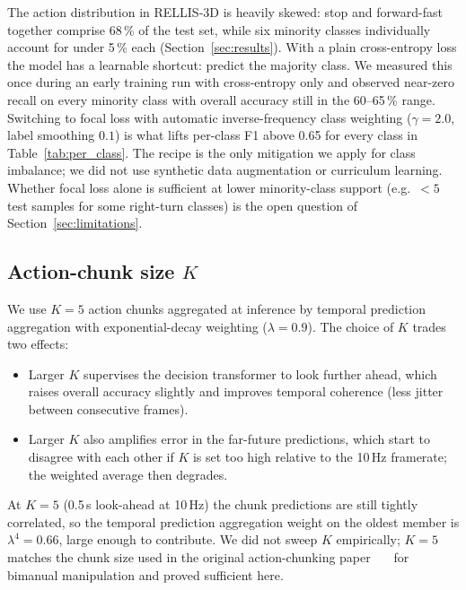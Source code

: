 \documentclass[sensors,article,submit,pdftex,moreauthors]{Definitions/mdpi}
\providecommand{\DIFadd}[1]{{\protect\color{red}#1}} %
\begin{document}
\DIFadd{The action distribution in RELLIS-3D is heavily skewed: stop and forward-fast together comprise 68\,\% of the test set, while six minority classes individually account for under 5\,\% each (Section~\ref{sec:results}). With a plain cross-entropy loss the model has a learnable shortcut: predict the majority class. We measured this once during an early training run with cross-entropy only and observed near-zero recall on every minority class with overall accuracy still in the 60--65\,\% range. Switching to focal loss with automatic inverse-frequency class weighting ($\gamma{=}2.0$, label smoothing $0.1$) is what lifts per-class F1 above 0.65 for every class in Table~\ref{tab:per_class}. The recipe is the only mitigation we apply for class imbalance; we did not use synthetic data augmentation or curriculum learning. Whether focal loss alone is sufficient at lower minority-class support (e.g.\ $<5$ test samples for some right-turn classes) is the open question of Section~\ref{sec:limitations}.
}

\subsection{\DIFadd{Action-chunk size $K$}}
\label{sec:ablation_chunk}

\DIFadd{We use $K{=}5$ action chunks aggregated at inference by temporal prediction aggregation with exponential-decay weighting ($\lambda{=}0.9$). The choice of $K$ trades two effects:
}\begin{itemize}
    \item \DIFadd{Larger $K$ supervises the decision transformer to look further ahead, which raises overall accuracy slightly and improves temporal coherence (less jitter between consecutive frames).
    }\item \DIFadd{Larger $K$ also amplifies error in the far-future predictions, which start to disagree with each other if $K$ is set too high relative to the 10\,Hz framerate; the weighted average then degrades.
}\end{itemize}
\DIFadd{At $K{=}5$ (0.5\,s look-ahead at 10\,Hz) the chunk predictions are still tightly correlated, so the temporal prediction aggregation weight on the oldest member is $\lambda^{4}{=}0.66$, large enough to contribute. We did not sweep $K$ empirically; $K{=}5$ matches the chunk size used in the original action-chunking paper~\mbox{%
\cite{zhao2023act} }\hskip0pt%
for bimanual manipulation and proved sufficient here.
}
\end{document}
